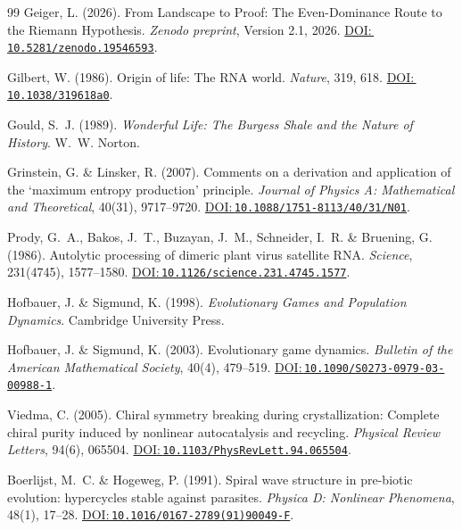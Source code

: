 \documentclass[12pt,a4paper]{article}
\newcommand{\doilink}[1]{\href{https://doi.org/#1}{DOI:\,\nolinkurl{#1}}}
\theoremstyle{remark}
\begin{document}
\begin{thebibliography}{99}
Geiger, L. (2026).
\newblock From Landscape to Proof: The Even-Dominance Route to the Riemann Hypothesis.
\newblock \textit{Zenodo preprint}, Version 2.1, 2026.
\newblock \doilink{10.5281/zenodo.19546593}.

Gilbert, W. (1986).
\newblock Origin of life: The RNA world.
\newblock \textit{Nature}, 319, 618.
\newblock \doilink{10.1038/319618a0}.

Gould, S.~J. (1989).
\newblock \textit{Wonderful Life: The Burgess Shale and the Nature of History}.
\newblock W.~W. Norton.

Grinstein, G. \& Linsker, R. (2007).
\newblock Comments on a derivation and application of the `maximum entropy production' principle.
\newblock \textit{Journal of Physics A: Mathematical and Theoretical}, 40(31), 9717--9720.
\newblock \doilink{10.1088/1751-8113/40/31/N01}.

Prody, G.~A., Bakos, J.~T., Buzayan, J.~M., Schneider, I.~R. \& Bruening, G. (1986).
\newblock Autolytic processing of dimeric plant virus satellite RNA.
\newblock \textit{Science}, 231(4745), 1577--1580.
\newblock \doilink{10.1126/science.231.4745.1577}.

Hofbauer, J. \& Sigmund, K. (1998).
\newblock \textit{Evolutionary Games and Population Dynamics}.
\newblock Cambridge University Press.

Hofbauer, J. \& Sigmund, K. (2003).
\newblock Evolutionary game dynamics.
\newblock \textit{Bulletin of the American Mathematical Society}, 40(4), 479--519.
\newblock \doilink{10.1090/S0273-0979-03-00988-1}.

Viedma, C. (2005).
\newblock Chiral symmetry breaking during crystallization: Complete chiral purity induced by nonlinear autocatalysis and recycling.
\newblock \textit{Physical Review Letters}, 94(6), 065504.
\newblock \doilink{10.1103/PhysRevLett.94.065504}.

Boerlijst, M.~C. \& Hogeweg, P. (1991).
\newblock Spiral wave structure in pre-biotic evolution: hypercycles stable against parasites.
\newblock \textit{Physica D: Nonlinear Phenomena}, 48(1), 17--28.
\newblock \doilink{10.1016/0167-2789(91)90049-F}.


\end{thebibliography}
\end{document}
